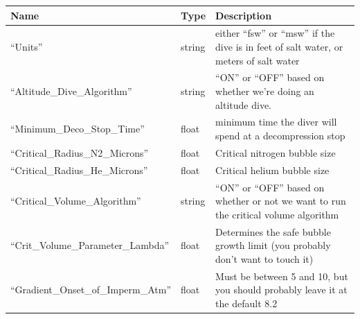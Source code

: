 \documentclass[12pt]{article}
\begin{document}
\begin{longtable}{|l|l|p{5cm}|}
\hline
 Name                                  &  Type                                                                                             &  Description                                                                              \\
\hline
 ``Units''                             &  string                                                                                           &  either ``fsw'' or ``msw'' if the dive is in feet of salt water, or meters of salt water  \\
\hline
 ``Altitude\_Dive\_Algorithm''         &  string                                                                                           &  ``ON'' or ``OFF'' based on whether we're doing an altitude dive.                         \\
\hline
 ``Minimum\_Deco\_Stop\_Time''         &  float                                                                                            &  minimum time the diver will spend at a decompression stop                                \\
\hline
 ``Critical\_Radius\_N2\_Microns''     &  float                                                             & Critical nitrogen bubble size                                                                                         \\
\hline
 ``Critical\_Radius\_He\_Microns''     &  float                                                               &  Critical helium bubble size                                                                                         \\
\hline
 ``Critical\_Volume\_Algorithm''       &  string  &  ``ON'' or ``OFF'' based on whether or not we want to run the critical volume algorithm                                                                                         \\
\hline
 ``Crit\_Volume\_Parameter\_Lambda''   &  float                                                                                            &  Determines the safe bubble growth limit (you probably don't want to touch it)                                                                                     \\
\hline
 ``Gradient\_Onset\_of\_Imperm\_Atm''  &  float                                                                                            &  Must be between 5 and 10, but you should probably leave it at the default 8.2                                                                                     \\

\end{longtable}
\end{document}
